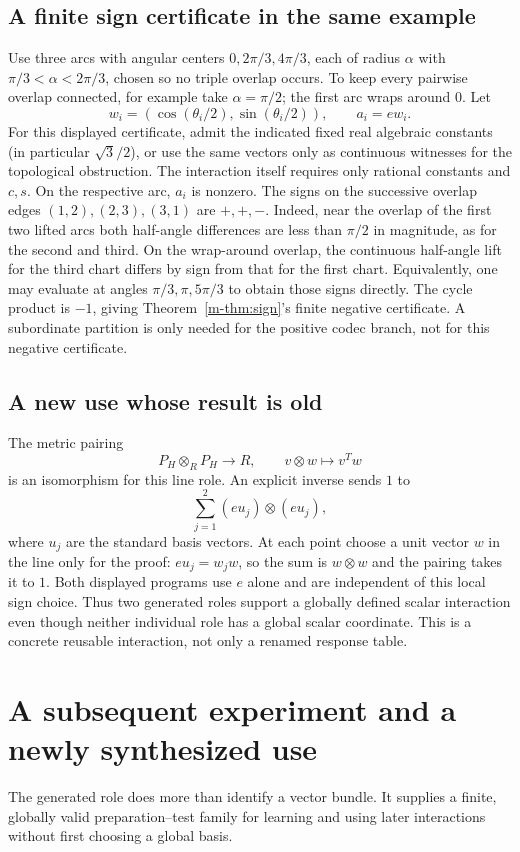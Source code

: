 \documentclass[11pt]{article}
\theoremstyle{definition}
\theoremstyle{remark}
\begin{document}
\subsection{A finite sign certificate in the same example}
Use three arcs with angular centers $0,2\pi/3,4\pi/3$, each of radius $\alpha$ with $\pi/3<\alpha<2\pi/3$, chosen so no triple overlap occurs. To keep every pairwise overlap connected, for example take $\alpha=\pi/2$; the first arc wraps around $0$. Let
\[
 w_i=(\cos(\theta_i/2),\sin(\theta_i/2)),\qquad a_i=e w_i.
\]
For this displayed certificate, admit the indicated fixed real algebraic constants (in particular $\sqrt3/2$), or use the same vectors only as continuous witnesses for the topological obstruction. The interaction itself requires only rational constants and $c,s$. On the respective arc, $a_i$ is nonzero. The signs on the successive overlap edges $(1,2),(2,3),(3,1)$ are $+,+,-$. Indeed, near the overlap of the first two lifted arcs both half-angle differences are less than $\pi/2$ in magnitude, as for the second and third. On the wrap-around overlap, the continuous half-angle lift for the third chart differs by sign from that for the first chart. Equivalently, one may evaluate at angles $\pi/3,\pi,5\pi/3$ to obtain those signs directly. The cycle product is $-1$, giving Theorem~\ref{m-thm:sign}'s finite negative certificate. A subordinate partition is only needed for the positive codec branch, not for this negative certificate.

\subsection{A new use whose result is old}
The metric pairing
\[
                      P_H\otimes_R P_H\longrightarrow R,
                      \qquad v\otimes w\longmapsto v^Tw
\]
is an isomorphism for this line role. An explicit inverse sends $1$ to
\[
                         \sum_{j=1}^2(eu_j)\otimes(eu_j),
\]
where $u_j$ are the standard basis vectors. At each point choose a unit vector $w$ in the line only for the proof: $eu_j=w_jw$, so the sum is $w\otimes w$ and the pairing takes it to $1$. Both displayed programs use $e$ alone and are independent of this local sign choice. Thus two generated roles support a globally defined scalar interaction even though neither individual role has a global scalar coordinate. This is a concrete reusable interaction, not only a renamed response table.

\section{A subsequent experiment and a newly synthesized use}
The generated role does more than identify a vector bundle. It supplies a finite, globally valid preparation--test family for learning and using later interactions without first choosing a global basis.
\end{document}
